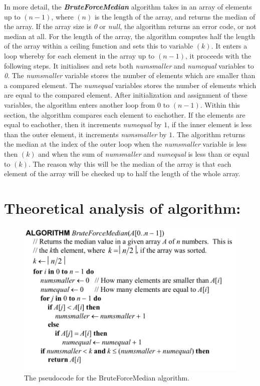 \documentclass[12pt]{article}
\begin{document}
In more detail, the \textit{\textbf{BruteForceMedian}} algorithm takes in an array of elements up to $(n-1)$, where $ (n) $ is the length of the array, and returns the median of the array. If the array size is \textit{0} or \textit{null}, the algorithm returns an error code, or not median at all. For the length of the array, the algorithm computes half the length of the array within a ceiling function and sets this to variable $(k)$. It enters a loop whereby for each element in the array up to $(n-1)$, it proceeds with the following steps. It initialises and sets both \textit{numsmaller} and \textit{numequal} variables to \textit{0}. The \textit{numsmaller} variable stores the number of elements which are smaller than a compared element. The \textit{numequal} variables stores the number of elements which are equal to the compared element. After initialization and assignment of these variables, the algorithm enters another loop from $0$ to  $(n-1)$. Within this section, the algorithm compares each element to eachother. If the elements are equal to eachother, then it increments \textit{numequal} by $1$, if the inner element is less than the outer element, it increments \textit{numsmaller} by $1$. The algorithm returns the median at the index of the outer loop when the \textit{numsmaller} variable is less then $(k)$ and when the sum of \textit{numsmaller} and \textit{numequal} is less than or equal to $(k)$. The reason why this will be the median of the array is that each element of the array will be checked up to half the length of the whole array. 

\section{Theoretical analysis of algorithm:}

\begin{figure}[H]
	\centering
	\includegraphics[width=0.7\linewidth]{Results/AlgorithmPseudocode}
	\caption{The pseudocode for the BruteForceMedian algorithm.}
	\label{fig:algorithmpseudocode}
\end{figure}
\end{document}
